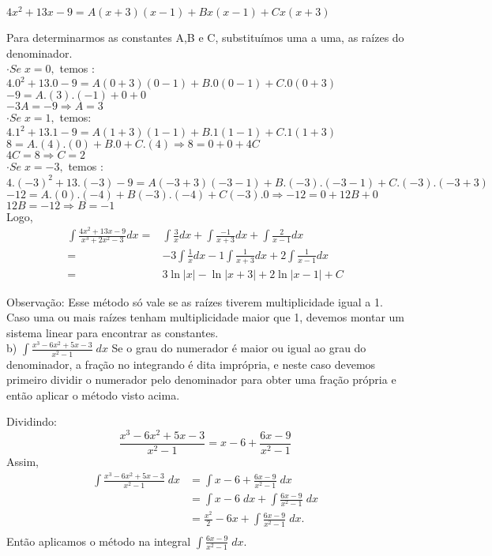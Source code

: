\documentclass[11pt]{article}
\begin{document}
$\displaystyle 4x^{2}+13x-9= A(x+3)(x-1)+Bx(x-1)+Cx(x+3)$

Para determinarmos as constantes A,B e C, substituímos uma a uma, as raízes do denominador.\\
$\cdot Se\; x=0, $ temos :\\
$4.0^{2}+13.0-9= A(0+3)(0-1)+B.0(0-1)+C.0(0+3)$\\
$-9=A.(3).(-1)+0+0$\\
$-3A=-9\Rightarrow A=3$\\
$\cdot Se\;x=1,$ temos:\\
$4.1^{2}+13.1-9= A(1+3)(1-1)+B.1(1-1)+C.1(1+3)$\\
$8=A.(4).(0)+B.0+C.(4)\Rightarrow8=0+0+4C$\\
$4C=8\Rightarrow C=2$\\
$\cdot Se\; x=-3, $ temos :\\
$4.(-3)^{2}+13.(-3)-9= A(-3+3)(-3-1)+B.(-3).(-3-1)+C.(-3).(-3+3)$\\
$-12=A.(0).(-4)+B(-3).(-4)+C(-3).0 \Rightarrow-12=0+12B+0$\\
$12B=-12\Rightarrow B=-1$\\
Logo,\\

\begin{align*}
  \int\frac{4x^{2}+13x-9}{x^{3}+2x^{2}-3}dx= & \int\frac{3}{x}dx+\int\frac{-1}{x+3}dx+\int\frac{2}{x-1}dx\\
   =& -3\int\frac{1}{x}dx-1\int\frac{1}{x+3} dx+2\int\frac{1}{x-1}dx\\
   =& 3\ln|x|-\ln|x+3|+2\ln|x-1|+C
\end{align*}

Observação: Esse método só vale se as raízes tiverem multiplicidade igual a 1. Caso uma ou mais raízes tenham multiplicidade maior que 1, devemos montar um sistema linear para encontrar as constantes.\\

b) $\displaystyle\int\frac{x^3-6x^2+5x-3}{x^2-1}\;dx$
Se o grau do numerador é maior ou igual ao grau do denominador, a fração no integrando é dita imprópria, e neste caso devemos primeiro dividir o numerador pelo denominador para obter uma fração própria e então aplicar o método visto acima.

Dividindo:\\
$$\frac{x^3-6x^2+5x-3}{x^2-1}= x-6 + \frac{6x-9}{x^2-1} $$
Assim,
\begin{align*}
  \int\frac{x^3-6x^2+5x-3}{x^2-1}\;dx & =\int x-6 + \frac{6x-9}{x^2-1}\;dx \\
  &  =\int x-6\;dx + \int \frac{6x-9}{x^2-1}\;dx \\
  &  =\frac{x^2}{2}- 6x  + \int \frac{6x-9}{x^2-1}\;dx. \\
\end{align*}
Então aplicamos o método na integral $\int \frac{6x-9}{x^2-1}\;dx$.
\end{document}
